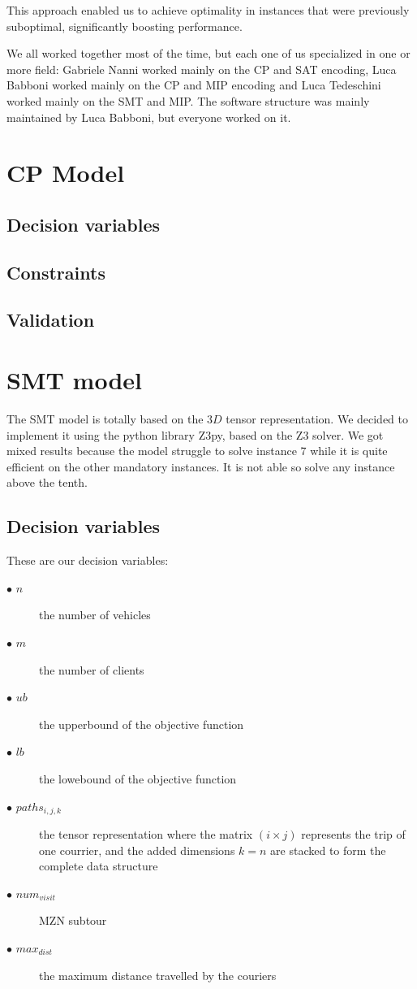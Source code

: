 \documentclass{article}
\begin{document}
This approach enabled us to achieve optimality in instances that were previously suboptimal, significantly boosting performance.

We all worked together most of the time, but each one of us specialized in one or more field: Gabriele Nanni worked mainly on the CP and SAT encoding, Luca Babboni worked mainly on the CP and MIP encoding and Luca Tedeschini worked mainly on the SMT and MIP. The software structure was mainly maintained by Luca Babboni, but everyone worked on it.


\section{CP Model}
\subsection{Decision variables}
\subsection{Constraints}
\subsection{Validation}
\section{SMT model}
The SMT model is totally based on the $3D$ tensor representation. We decided to implement it using the python library Z3py, based on the Z3 solver. We got mixed results because the model struggle to solve instance 7 while it is quite efficient on the other mandatory instances. It is not able so solve any instance above the tenth.  
\subsection{Decision variables}
These are our decision variables:
\begin{description}
	\item[$\bullet$ $n$] the number of vehicles
	\item[$\bullet$ $m$] the number of clients
	\item[$\bullet$ $ub$] the upperbound of the objective function
	\item[$\bullet$ $lb$] the lowebound of the objective function
	\item[$\bullet$ $paths_{i,j,k}$] the tensor representation where the matrix $(i \times j)$ represents the trip of one courrier, and the added dimensions $k=n$ are stacked to form the complete data structure
	\item[$\bullet$ $num_{visit}$] MZN subtour %
	\item[$\bullet$ $max_{dist}$] the maximum distance travelled by the couriers
\end{description}
\end{document}
